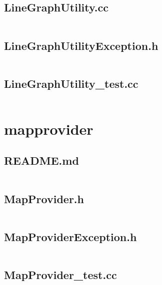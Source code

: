 \documentclass[../main.tex]{subfiles}
\begin{document}
\subsection{LineGraphUtility.cc}\label{lst:lgu-linegraph-utility-cc}
\inputminted[linenos=true]{cpp}{parts/code/lgu/LineGraphUtility.cc}

\subsection{LineGraphUtilityException.h}\label{lst:lgu-linegraph-utility-exception-h}
\inputminted[linenos=true]{cpp}{parts/code/lgu/LineGraphUtilityException.h}

\subsection{LineGraphUtility\_test.cc}\label{lst:lgu-linegraph-utility-test-cc}
\inputminted[linenos=true]{cpp}{parts/code/lgu/catchtest/LineGraphUtility_test.cc}

\section{mapprovider}

\subsection{README.md}\label{lst:mapprovider-readme-md}
\inputminted[breaklines=true]{text}{parts/code/mapprovider/README.md}

\subsection{MapProvider.h}\label{lst:mapprovider-mapprovider-h}
\inputminted[linenos=true]{cpp}{parts/code/mapprovider/MapProvider.h}

\subsection{MapProviderException.h}\label{lst:mapprovider-mapprovider-exception-h}
\inputminted[linenos=true]{cpp}{parts/code/mapprovider/MapProviderException.h}

\subsection{MapProvider\_test.cc}\label{lst:mapprovider-mapprovider-test-cc}
\inputminted[linenos=true]{cpp}{parts/code/mapprovider/catchtest/MapProvider_test.cc}
\end{document}
